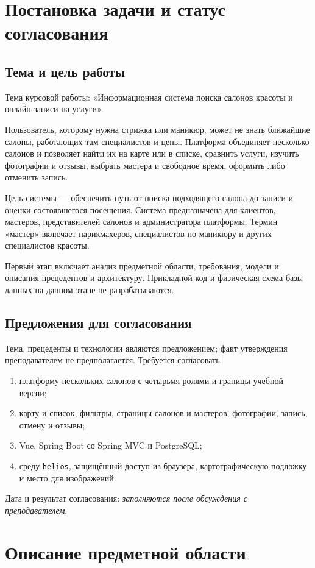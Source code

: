 \section{Постановка задачи и статус согласования}
\subsection{Тема и цель работы}
Тема курсовой работы: «Информационная система поиска салонов красоты и онлайн-записи на услуги».

Пользователь, которому нужна стрижка или маникюр, может не знать ближайшие салоны, работающих там специалистов и цены. Платформа объединяет несколько салонов и позволяет найти их на карте или в списке, сравнить услуги, изучить фотографии и отзывы, выбрать мастера и свободное время, оформить либо отменить запись.

Цель системы --- обеспечить путь от поиска подходящего салона до записи и оценки состоявшегося посещения. Система предназначена для клиентов, мастеров, представителей салонов и администратора платформы. Термин «мастер» включает парикмахеров, специалистов по маникюру и других специалистов красоты.

Первый этап включает анализ предметной области, требования, модели и описания прецедентов и архитектуру. Прикладной код и физическая схема базы данных на данном этапе не разрабатываются.

\subsection{Предложения для согласования}
Тема, прецеденты и технологии являются предложением; факт утверждения преподавателем не предполагается. Требуется согласовать:
\begin{enumerate}
\item платформу нескольких салонов с четырьмя ролями и границы учебной версии;
\item карту и список, фильтры, страницы салонов и мастеров, фотографии, запись, отмену и отзывы;
\item Vue, Spring Boot со Spring MVC и PostgreSQL;
\item среду \texttt{helios}, защищённый доступ из браузера, картографическую подложку и место для изображений.
\end{enumerate}
Дата и результат согласования: \textit{заполняются после обсуждения с преподавателем}.

\section{Описание предметной области}

